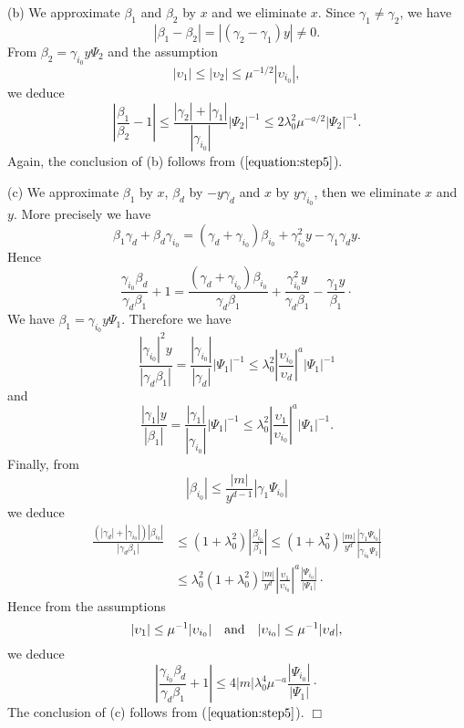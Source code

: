 \documentclass[leqno,11pt]{article}
\begin{document}
 
\indent
(b) We approximate $\beta_1$ and $\beta_2$ by $x$ and we eliminate $x$. Since $\gamma_1\not=\gamma_2$, we have 
$$
|\beta_1-\beta_2|= |(\gamma_2-\gamma_1) y| \not=0.
$$
From $\beta_2=\gamma_{i_0} y \Psi_2$ and the assumption
$$
 |\upsilon_1|\le|\upsilon_2|\le \mu^{-1/2} |\upsilon_{i_0}|,
 $$
we deduce 
$$
\left|
\frac{ \beta_1}{\beta_2}-1
\right|
\le
\frac{|\gamma_2|+|\gamma_1|}{|\gamma_{i_0}|} |\Psi_2|^{-1}
 \le 2\lambda_0^2\mu^{-a/2} |\Psi_2|^{-1}.
$$
Again, the conclusion of (b) follows from ($\ref{equation:step5}$).

\indent
(c) 
We approximate $\beta_1$ by $x$, $\beta_d$ by $-y\gamma_d$ and $x$ by $y \gamma_{i_0}$, then we eliminate $x$ and $y$. More precisely we have
$$
\beta_1\gamma_d+\beta_d\gamma_{i_0}=
(\gamma_d+\gamma_{i_0})\beta_{i_0} +\gamma_{i_0}^2y-\gamma_1\gamma_dy.
$$
 Hence 
$$
\frac{
\gamma_{i_0}\beta_d}{\gamma_d \beta_1}+1=
\frac{
(\gamma_d+\gamma_{i_0})\beta_{i_0}}{\gamma_d\beta_1} +
\frac{\gamma_{i_0}^2y}{\gamma_d\beta_1} -
\frac{\gamma_1 y}{ \beta_1}
\cdotp
$$ 
We have $\beta_1=\gamma_{i_0}y\Psi_1$. Therefore we have  
$$
\frac{|\gamma_{i_0}|^2y}{|\gamma_d\beta_1|}
=\frac{|\gamma_{i_0}|}{|\gamma_d|} |\Psi_1|^{-1} \le \lambda_0^2 \left|
\frac{\upsilon_{i_0}}{\upsilon_d}\right|^a |\Psi_1|^{-1}
$$
and                    
$$
\frac{|\gamma_1| y}{ |\beta_1|}=\frac{|\gamma_1| }{ |\gamma_{i_0}|} |\Psi_1|^{-1}
 \le
 \lambda_0^2 \left|
\frac{\upsilon_1}{\upsilon_{i_0}}\right|^a |\Psi_1|^{-1}.
$$
Finally, from 
$$
|\beta_{i_0}|\le \frac{|m|}{y^{d-1}}|\gamma_1\Psi_{i_0}|
$$ 
we deduce   
$$  \begin{array}{ll}
\displaystyle \frac{
(|\gamma_d|+|\gamma_{i_0}|)|\beta_{i_0}|}{|\gamma_d\beta_1|} 
&\le
(1+ \lambda_0^2)\left| \displaystyle 
\frac{\beta_{i_0}}{\beta_1}\right|\le
(1+ \lambda_0^2) \displaystyle 
\frac{|m|}{ y^d}\displaystyle 
\frac{|\gamma_1\Psi_{i_0}|}{|\gamma_{i_0}\Psi_1|}\\[6mm]
&\le
 \lambda_0^2(1+ \lambda_0^2)\displaystyle 
\frac{|m|}{ y^d}
 \left|
\frac{\upsilon_1}{\upsilon_{i_0}}
\right|^a\displaystyle 
\frac{|\Psi_{i_0}|}{ |\Psi_1|}\cdotp
\end{array}
$$%
Hence from the assumptions  
$$ 
|\upsilon_1|\le
\mu^{-1} |\upsilon_{i_0}|
 \quad\hbox{and}
 \quad
 |\upsilon_{i_0}| \le
 \mu^{-1} |\upsilon_d|,
$$
we deduce  
$$
\left|
\frac{\gamma_{i_0}\beta_d}{\gamma_d \beta_1}+1
\right|
\le 4|m| \lambda_0^4 \mu^{- a } 
\frac{|\Psi_{i_0}|}{ |\Psi_1|}\cdot
$$
The conclusion of (c) follows from ($\ref{equation:step5}$).
\hfill $\Box$        
\end{document}

